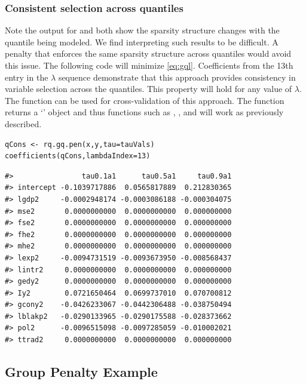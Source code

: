 \subsubsection{Consistent selection across quantiles}\label{consistent-selection-across-quantiles-1}

Note the output for  and  both show the sparsity structure changes with the quantile being modeled. We find interpreting such results to be difficult. A penalty that enforces the same sparsity structure across quantiles would avoid this issue. The following code will minimize \eqref{eq:gql}. Coefficients from the 13th entry in the \(\lambda\) sequence demonstrate that this approach provides consistency in variable selection across the quantiles. This property will hold for any value of \(\lambda\). The function  can be used for cross-validation of this approach. The function  returns a `' object and thus functions such as , , and  will work as previously described.

\begin{verbatim}
qCons <- rq.gq.pen(x,y,tau=tauVals)
coefficients(qCons,lambdaIndex=13)
\end{verbatim}

\begin{verbatim}
#>                tau0.1a1      tau0.5a1     tau0.9a1
#> intercept -0.1039717886  0.0565817889  0.212830365
#> lgdp2     -0.0002948174 -0.0003086188 -0.000304075
#> mse2       0.0000000000  0.0000000000  0.000000000
#> fse2       0.0000000000  0.0000000000  0.000000000
#> fhe2       0.0000000000  0.0000000000  0.000000000
#> mhe2       0.0000000000  0.0000000000  0.000000000
#> lexp2     -0.0094731519 -0.0093673950 -0.008568437
#> lintr2     0.0000000000  0.0000000000  0.000000000
#> gedy2      0.0000000000  0.0000000000  0.000000000
#> Iy2        0.0721650464  0.0699737010  0.070700812
#> gcony2    -0.0426233067 -0.0442306488 -0.038750494
#> lblakp2   -0.0290133965 -0.0290175588 -0.028373662
#> pol2      -0.0096515098 -0.0097285059 -0.010002021
#> ttrad2     0.0000000000  0.0000000000  0.000000000
\end{verbatim}

\subsection{Group Penalty Example}\label{group-penalty-example}

